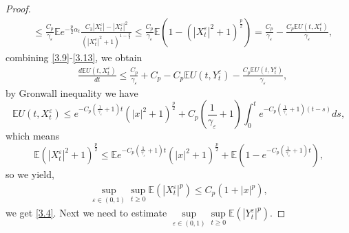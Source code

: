 \documentclass[11pt,reqno]{amsart}
\numberwithin{equation}{section}
\begin{document}
\begin{proof}
\begin{equation}
\begin{split}
			&\leq  \frac{C_{p}}{\gamma_{\varepsilon}}\mathbb{E}e^{-\frac{p}{2}\alpha_{t}} \frac{C_{3}|X_{t}^{\varepsilon}|-|X_{t}^{\varepsilon}|^{2}}{(|X_{t}^{\varepsilon}|^{2}+1)^{1-\frac{p}{2}}}\leq \frac{C_{p}}{\gamma_{\varepsilon}}\mathbb{E}\left( 1-(|X_{t}^{\varepsilon}|^{2}+1)^{\frac{p}{2}}\right)=\frac{C_{p}}{\gamma_{\varepsilon}}-\frac{C_{p}\mathbb{E}U(t,X_{t}^{\varepsilon})}{\gamma_{\varepsilon}},   
		\end{split}
	\end{equation}
	combining \eqref{3.9}-\eqref{3.13}, we obtain
	\begin{equation}
		\begin{split}
			&\frac{d\mathbb{E}U(t,X_{t}^{\varepsilon})}{dt}\leq\frac{C_{p}}{\gamma_{\varepsilon}}+C_{p}-C_{p}\mathbb{E}U(t,Y_{t}^{\varepsilon})-\frac{C_{p}\mathbb{E}U(t,Y_{t}^{\varepsilon})}{\gamma_{\varepsilon}},
		\end{split}\nonumber
	\end{equation}
	by Gronwall inequality we have 
	\begin{equation}
		\mathbb{E}U(t,X_{t}^{\varepsilon})\leq e^{-C_{p}(\frac{1}{\gamma_{\varepsilon}}+1)t}(|x|^{2}+1)^{\frac{p}{2}}+C_{p}(\frac{1}{\gamma_{\varepsilon}}+1)\int^{t}_{0}e^{-C_{p}(\frac{1}{\gamma_{\varepsilon}}+1)(t-s)}ds,\nonumber
	\end{equation}
	which means
	$$\mathbb{E}(|X_{t}^{\varepsilon}|^{2}+1)^{\frac{p}{2}}\leq \mathbb{E}e^{-C_{p}(\frac{1}{\gamma_{\varepsilon}}+1)t}(|x|^{2}+1)^{\frac{p}{2}}+\mathbb{E}(1-e^{-C_{p}(\frac{1}{\gamma_{\varepsilon}}+1)t}),$$
	so we yield, 
	\begin{equation}\label{3.14}
		\begin{split}
			\sup\limits_{\varepsilon\in (0,1)}\sup\limits_{t\geq0} \mathbb{E}\left(|X_{t}^{\varepsilon}|^{p}\right)\leq C_{p}(1+|x|^{p}),
		\end{split}
	\end{equation}
	we get \eqref{3.4}. Next we need to estimate $\sup\limits_{\varepsilon\in (0,1)}\sup\limits_{t\geq0}\mathbb{E}\left(|Y_{t}^{\varepsilon}|^{p}\right) $.
	

\end{proof}
\end{document}
